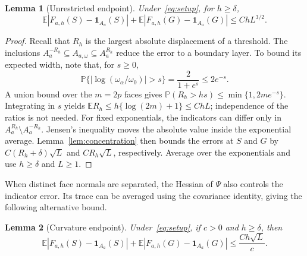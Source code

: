 \documentclass[11pt,letterpaper]{article}
\newtheorem{lemma}{Lemma}
\theoremstyle{remark}
\newcommand{\E}{\mathbb E}
\newcommand{\Pp}{\mathbb P}
\newcommand{\ind}{\mathbf 1}
\begin{document}
\begin{lemma}[Unrestricted endpoint]\label{appx-lem:endpoint-free}
Under~\eqref{eq:setup}, for \(h\ge\delta\),
\begin{equation}
 \E|F_{a,h}(S)-\ind_{A_a}(S)|
 +\E|F_{a,h}(G)-\ind_{A_a}(G)|\le ChL^{3/2}.
 \label{appx-eq:endpoint-free}
\end{equation}
\end{lemma}

\begin{proof}
Recall that \(R_h\) is the largest absolute displacement of a threshold.
The inclusions \(A_a^{-R_h}\subseteq A_{a,\omega}\subseteq A_a^{R_h}\)
reduce the error to a boundary layer. To bound its expected width,
note that, for \(s\ge0\),
\[
 \Pp\{|\log(\omega_\alpha/\omega_0)|>s\}
 =\frac2{1+e^s}\le2e^{-s}.
\]
A union bound over the \(m=2p\) faces gives
\(\Pp(R_h>hs)\le\min\{1,2me^{-s}\}\). Integrating in \(s\)
yields \(\E R_h\le h\{\log(2m)+1\}\le ChL\); independence
of the ratios is not needed.
For fixed exponentials, the indicators can differ only in
\(A_a^{R_h}\setminus A_a^{-R_h}\). Jensen's inequality moves
the absolute value inside the exponential average.
Lemma~\ref{lem:concentration} then bounds the errors at \(S\)
and \(G\) by \(C(R_h+\delta)\sqrt L\) and \(CR_h\sqrt L\),
respectively. Average over the exponentials and use \(h\ge\delta\)
and \(L\ge1\).
\end{proof}

When distinct face normals are separated, the Hessian of \(\Psi\)
also controls the indicator error. Its trace can be averaged using
the covariance identity, giving the following alternative bound.
\begin{lemma}[Curvature endpoint]\label{appx-lem:endpoint-gap}
Under~\eqref{eq:setup}, if \(c>0\) and \(h\ge\delta\), then
\begin{equation}
 \E|F_{a,h}(S)-\ind_{A_a}(S)|
 +\E|F_{a,h}(G)-\ind_{A_a}(G)|
 \le\frac{Ch\sqrt L}{c}.
 \label{appx-eq:endpoint-gap}
\end{equation}
\end{lemma}
\end{document}
